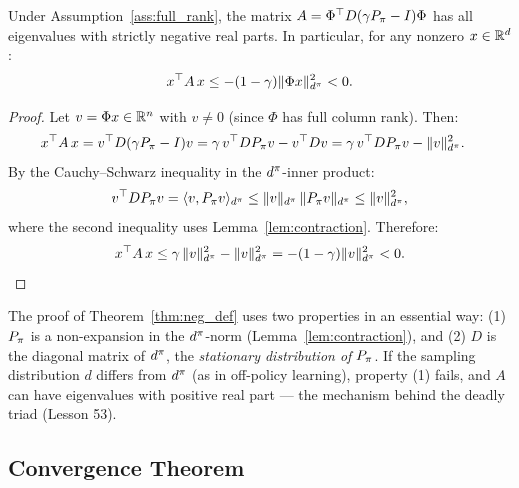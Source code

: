 \documentclass[11pt,a4paper]{article}
\begin{document}
\begin{theorem}
\label{thm:neg_def}
Under Assumption~\ref{ass:full_rank}, the matrix
$A = \Phi^\top D(\gamma P_\pi - I)\Phi$ has all eigenvalues with
strictly negative real parts. In particular, for any nonzero
$x \in \mathbb{R}^d$:
\begin{equation}
  x^\top A\, x \leq -(1-\gamma)\|\Phi x\|_{d^\pi}^2 < 0.
  \label{eq:neg_def}
\end{equation}
\end{theorem}

\begin{proof}
Let $v = \Phi x \in \mathbb{R}^n$ with $v \neq 0$ (since $\Phi$ has full
column rank). Then:
\begin{align}
  x^\top A\, x
  &= v^\top D(\gamma P_\pi - I)v
  = \gamma\, v^\top D P_\pi v - v^\top D v
  = \gamma\, v^\top D P_\pi v - \|v\|_{d^\pi}^2.
  \label{eq:quad_A}
\end{align}
By the Cauchy--Schwarz inequality in the $d^\pi$-inner product:
\begin{equation}
  v^\top D P_\pi v
  = \langle v, P_\pi v \rangle_{d^\pi}
  \leq \|v\|_{d^\pi}\,\|P_\pi v\|_{d^\pi}
  \leq \|v\|_{d^\pi}^2,
  \label{eq:cs_bound}
\end{equation}
where the second inequality uses Lemma~\ref{lem:contraction}. Therefore:
\begin{equation}
  x^\top A\, x
  \leq \gamma\,\|v\|_{d^\pi}^2 - \|v\|_{d^\pi}^2
  = -(1-\gamma)\|v\|_{d^\pi}^2 < 0. \qedhere
\end{equation}
\end{proof}

\begin{remark}
\label{rem:key_property}
The proof of Theorem~\ref{thm:neg_def} uses two properties in an
essential way: (1) $P_\pi$ is a non-expansion in the
$d^\pi$-norm (Lemma~\ref{lem:contraction}), and (2) $D$ is the
diagonal matrix of $d^\pi$, the \emph{stationary distribution of
$P_\pi$}. If the sampling distribution $d$ differs from $d^\pi$
(as in off-policy learning), property (1) fails, and $A$ can have
eigenvalues with positive real part --- the mechanism behind the deadly
triad (Lesson 53).
\end{remark}

\subsection{Convergence Theorem}
\label{subsec:convergence_thm}
\end{document}
